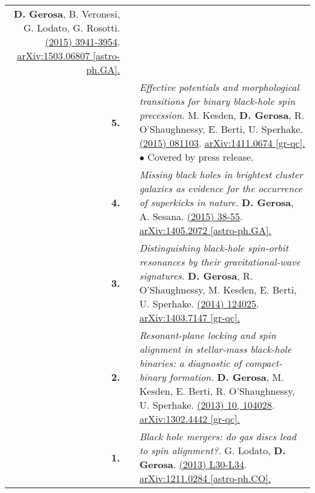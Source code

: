 {\begin{longtable}{rp{0.3cm}p{15.8cm}}
\newline{}
\textbf{D. Gerosa}, B. Veronesi, G. Lodato, G. Rosotti.
\newline{}
\href{http://dx.doi.org/10.1093/mnras/stv1214}{\mnras 451 (2015) 3941-3954}. \href{https://arxiv.org/abs/1503.06807}{arXiv:1503.06807 [astro-ph.GA].}
\vspace{0.09cm}\\
%
\textbf{5.} & & \textit{Effective potentials and morphological transitions for binary black-hole spin precession.}
\newline{}
M. Kesden, \textbf{D. Gerosa}, R. O'Shaughnessy, E. Berti, U. Sperhake.
\newline{}
\href{http://dx.doi.org/10.1103/PhysRevLett.114.081103}{\prl 114 (2015) 081103}. \href{https://arxiv.org/abs/1411.0674}{arXiv:1411.0674 [gr-qc].}
\newline{}
\textcolor{color1}{$\bullet$} Covered by press release.
\vspace{0.09cm}\\
%
\textbf{4.} & & \textit{Missing black holes in brightest cluster galaxies as evidence for the occurrence of superkicks in nature.}
\newline{}
\textbf{D. Gerosa}, A. Sesana.
\newline{}
\href{http://dx.doi.org/10.1093/mnras/stu2049}{\mnras 446 (2015) 38-55}. \href{https://arxiv.org/abs/1405.2072}{arXiv:1405.2072 [astro-ph.GA].}
\vspace{0.09cm}\\
%
\textbf{3.} & & \textit{Distinguishing black-hole spin-orbit resonances by their gravitational-wave signatures.}
\newline{}
\textbf{D. Gerosa}, R. O'Shaughnessy, M. Kesden, E. Berti, U. Sperhake.
\newline{}
\href{http://dx.doi.org/10.1103/PhysRevD.89.124025}{\prd 89 (2014) 124025}. \href{https://arxiv.org/abs/1403.7147}{arXiv:1403.7147 [gr-qc].}
\vspace{0.09cm}\\
%
\textbf{2.} & & \textit{Resonant-plane locking and spin alignment in stellar-mass black-hole binaries: a diagnostic of compact-binary formation.}
\newline{}
\textbf{D. Gerosa}, M. Kesden, E. Berti, R. O'Shaughnessy, U. Sperhake.
\newline{}
\href{http://dx.doi.org/10.1103/PhysRevD.87.104028}{\prd 87 (2013) 10, 104028}. \href{https://arxiv.org/abs/1302.4442}{arXiv:1302.4442 [gr-qc].}
\vspace{0.09cm}\\
%
\textbf{1.} & & \textit{Black hole mergers: do gas discs lead to spin alignment?.}
\newline{}
G. Lodato, \textbf{D. Gerosa}.
\newline{}
\href{http://dx.doi.org/10.1093/mnrasl/sls018}{\mnrasl 429 (2013) L30-L34}. \href{https://arxiv.org/abs/1211.0284}{arXiv:1211.0284 [astro-ph.CO].}
\vspace{0.09cm}\\
%
\end{longtable} }
